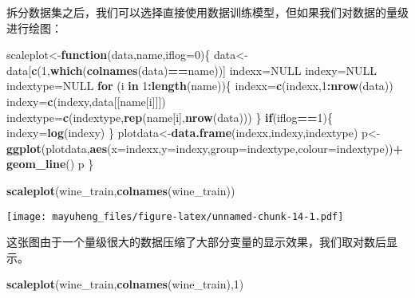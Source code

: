 \documentclass[]{article}
\newenvironment{Shaded}{\begin{snugshade}}{\end{snugshade}}
\newcommand{\ControlFlowTok}[1]{\textcolor[rgb]{0.13,0.29,0.53}{\textbf{#1}}}
\newcommand{\DataTypeTok}[1]{\textcolor[rgb]{0.13,0.29,0.53}{#1}}
\newcommand{\DecValTok}[1]{\textcolor[rgb]{0.00,0.00,0.81}{#1}}
\newcommand{\KeywordTok}[1]{\textcolor[rgb]{0.13,0.29,0.53}{\textbf{#1}}}
\newcommand{\NormalTok}[1]{#1}
\newcommand{\OperatorTok}[1]{\textcolor[rgb]{0.81,0.36,0.00}{\textbf{#1}}}
\newcommand{\OtherTok}[1]{\textcolor[rgb]{0.56,0.35,0.01}{#1}}
\begin{document}
拆分数据集之后，我们可以选择直接使用数据训练模型，但如果我们对数据的量级进行绘图：

\begin{Shaded}
\begin{Highlighting}[]
\NormalTok{scaleplot<-}\ControlFlowTok{function}\NormalTok{(data,name,}\DataTypeTok{iflog=}\DecValTok{0}\NormalTok{)\{}
\NormalTok{  data<-data[}\KeywordTok{c}\NormalTok{(}\DecValTok{1}\NormalTok{,}\KeywordTok{which}\NormalTok{(}\KeywordTok{colnames}\NormalTok{(data)}\OperatorTok{==}\NormalTok{name))]}
\NormalTok{  indexx=}\OtherTok{NULL}
\NormalTok{  indexy=}\OtherTok{NULL}
\NormalTok{  indextype=}\OtherTok{NULL}
  \ControlFlowTok{for}\NormalTok{ (i }\ControlFlowTok{in} \DecValTok{1}\OperatorTok{:}\KeywordTok{length}\NormalTok{(name))\{}
\NormalTok{    indexx=}\KeywordTok{c}\NormalTok{(indexx,}\DecValTok{1}\OperatorTok{:}\KeywordTok{nrow}\NormalTok{(data))}
\NormalTok{    indexy=}\KeywordTok{c}\NormalTok{(indexy,data[[name[i]]])}
\NormalTok{    indextype=}\KeywordTok{c}\NormalTok{(indextype,}\KeywordTok{rep}\NormalTok{(name[i],}\KeywordTok{nrow}\NormalTok{(data)))}
\NormalTok{  \}}
  \ControlFlowTok{if}\NormalTok{(iflog}\OperatorTok{==}\DecValTok{1}\NormalTok{)\{}
\NormalTok{    indexy=}\KeywordTok{log}\NormalTok{(indexy)}
\NormalTok{  \}}
\NormalTok{  plotdata<-}\KeywordTok{data.frame}\NormalTok{(indexx,indexy,indextype)}
\NormalTok{  p<-}\KeywordTok{ggplot}\NormalTok{(plotdata,}\KeywordTok{aes}\NormalTok{(}\DataTypeTok{x=}\NormalTok{indexx,}\DataTypeTok{y=}\NormalTok{indexy,}\DataTypeTok{group=}\NormalTok{indextype,}\DataTypeTok{colour=}\NormalTok{indextype))}\OperatorTok{+}\KeywordTok{geom_line}\NormalTok{()}
\NormalTok{  p}
\NormalTok{\}}
\end{Highlighting}
\end{Shaded}

\begin{Shaded}
\begin{Highlighting}[]
\KeywordTok{scaleplot}\NormalTok{(wine_train,}\KeywordTok{colnames}\NormalTok{(wine_train))}
\end{Highlighting}
\end{Shaded}

\texttt{[image: mayuheng\_files/figure-latex/unnamed-chunk-14-1.pdf]}

这张图由于一个量级很大的数据压缩了大部分变量的显示效果，我们取对数后显示。

\begin{Shaded}
\begin{Highlighting}[]
\KeywordTok{scaleplot}\NormalTok{(wine_train,}\KeywordTok{colnames}\NormalTok{(wine_train),}\DecValTok{1}\NormalTok{)}
\end{Highlighting}
\end{Shaded}
\end{document}
